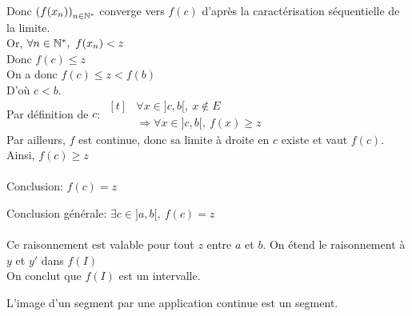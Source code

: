 \documentclass[12pt,twoside,a4paper]{article}
\begin{document}
\begin{preuve}
\begin{tab}
				Donc $\left( f(x_n)\right) _{n\in\mathbb{N}^{*}}$ converge vers $f(c)$ d'après la caractérisation séquentielle de la limite.\\
				Or, $\forall n\in\N^{*},\ f(x_n)<z$\\
				Donc $f(c)\leqslant z$\\
				On a donc $f(c)\leqslant z<f(b)$\\
				D'o\`u $c<b$.\\
				Par définition de $c$: $\begin{aligned}[t]
				& \forall x\in ]c,b[,\ x\notin E\\
				& \Rightarrow \forall x\in ]c,b[,\ f(x)\geqslant z
				\end{aligned}$\\
				Par ailleurs, $f$ est continue, donc sa limite \`a droite en $c$ existe et vaut $f(c)$.\\
				Ainsi, $f(c)\geqslant z$\\
				\\
				Conclusion: $f(c)=z$
			\end{tab}	
			Conclusion générale: $\exists c\in ]a,b[,\ f(c)=z$\\
			\\
			Ce raisonnement est valable pour tout $z$ entre $a$ et $b$. On étend le raisonnement \`a $y$ et $y'$ dans $f(I)$\\
			On conclut que $f(I)$ est un intervalle.
		\end{preuve}
		\begin{prop}
			L'image d'un segment par une application continue est un segment.
		\end{prop}
\end{document}
